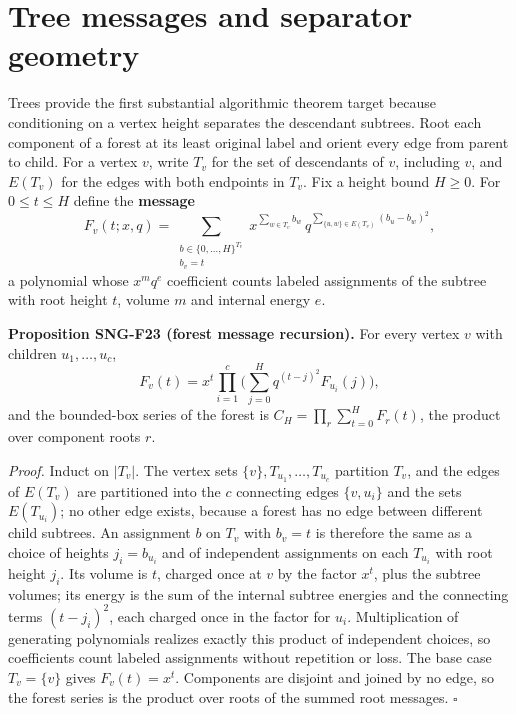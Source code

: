 \documentclass[
  11pt,
  a4paper,
]{report}
\begin{document}
\hypertarget{tree-messages-and-separator-geometry}{%
\section{Tree messages and separator
geometry}\label{tree-messages-and-separator-geometry}}

Trees provide the first substantial algorithmic theorem target because
conditioning on a vertex height separates the descendant subtrees. Root
each component of a forest at its least original label and orient every
edge from parent to child. For a vertex \(v\), write \(T_v\) for the set
of descendants of \(v\), including \(v\), and \(E(T_v)\) for the edges
with both endpoints in \(T_v\). Fix a height bound \(H\ge0\). For
\(0\le t\le H\) define the \textbf{message} \[
F_v(t;x,q)=\sum_{\substack{b\in\{0,\ldots,H\}^{T_v}\\ b_v=t}}x^{\sum_{w\in T_v}b_w}\,q^{\sum_{\{u,w\}\in E(T_v)}(b_u-b_w)^2},
\] a polynomial whose \(x^mq^e\) coefficient counts labeled assignments
of the subtree with root height \(t\), volume \(m\) and internal energy
\(e\).

\textbf{Proposition SNG-F23 (forest message recursion).} For every
vertex \(v\) with children \(u_1,\ldots,u_c\), \[
F_v(t)=x^t\prod_{i=1}^{c}\bigl(\sum_{j=0}^{H}q^{(t-j)^2}F_{u_i}(j)\bigr),
\] and the bounded-box series of the forest is
\(C_H=\prod_{r}\sum_{t=0}^HF_r(t)\), the product over component roots
\(r\).

\emph{Proof.} Induct on \(|T_v|\). The vertex sets
\(\{v\},T_{u_1},\ldots,T_{u_c}\) partition \(T_v\), and the edges of
\(E(T_v)\) are partitioned into the \(c\) connecting edges \(\{v,u_i\}\)
and the sets \(E(T_{u_i})\); no other edge exists, because a forest has
no edge between different child subtrees. An assignment \(b\) on \(T_v\)
with \(b_v=t\) is therefore the same as a choice of heights
\(j_i=b_{u_i}\) and of independent assignments on each \(T_{u_i}\) with
root height \(j_i\). Its volume is \(t\), charged once at \(v\) by the
factor \(x^t\), plus the subtree volumes; its energy is the sum of the
internal subtree energies and the connecting terms \((t-j_i)^2\), each
charged once in the factor for \(u_i\). Multiplication of generating
polynomials realizes exactly this product of independent choices, so
coefficients count labeled assignments without repetition or loss. The
base case \(T_v=\{v\}\) gives \(F_v(t)=x^t\). Components are disjoint
and joined by no edge, so the forest series is the product over roots of
the summed root messages. \(\square\)
\end{document}
